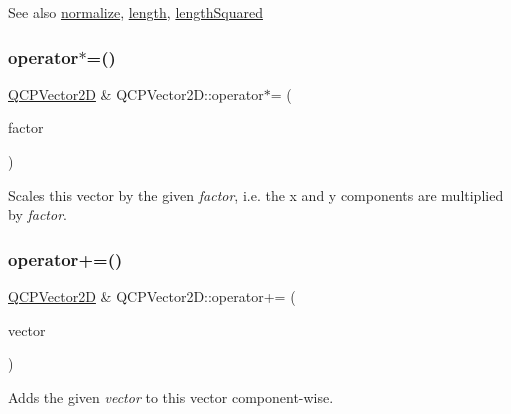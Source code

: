 \begin{DoxySeeAlso}{See also}
\mbox{\hyperlink{class_q_c_p_vector2_d_ad83268be370685c2a0630acc0fb1a425}{normalize}}, \mbox{\hyperlink{class_q_c_p_vector2_d_a10adb5ab031fe94f0b64a3c5aefb552e}{length}}, \mbox{\hyperlink{class_q_c_p_vector2_d_a766585459d84cb149334fda1a498b2e5}{length\+Squared}} 
\end{DoxySeeAlso}
\mbox{\label{class_q_c_p_vector2_d_aa52a246d168f475a4231c7bdfdac7df1}} 
\subsubsection{\texorpdfstring{operator$\ast$=()}{operator*=()}}
{\footnotesize\ttfamily \mbox{\hyperlink{class_q_c_p_vector2_d}{Q\+C\+P\+Vector2D}} \& Q\+C\+P\+Vector2\+D\+::operator$\ast$= (\begin{DoxyParamCaption}\item[{double}]{factor }\end{DoxyParamCaption})}

Scales this vector by the given {\itshape factor}, i.\+e. the x and y components are multiplied by {\itshape factor}. \mbox{\label{class_q_c_p_vector2_d_aa2c34754ce8839b2d074dec741783c5e}} 
\subsubsection{\texorpdfstring{operator+=()}{operator+=()}}
{\footnotesize\ttfamily \mbox{\hyperlink{class_q_c_p_vector2_d}{Q\+C\+P\+Vector2D}} \& Q\+C\+P\+Vector2\+D\+::operator+= (\begin{DoxyParamCaption}\item[{const \mbox{\hyperlink{class_q_c_p_vector2_d}{Q\+C\+P\+Vector2D}} \&}]{vector }\end{DoxyParamCaption})}

Adds the given {\itshape vector} to this vector component-\/wise. \mbox{\label{class_q_c_p_vector2_d_a3a2e906bb924983bb801e89f28a3d566}} 
